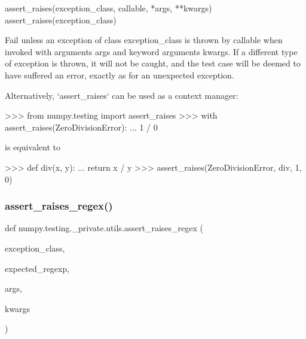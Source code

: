 \begin{DoxyVerb}assert_raises(exception_class, callable, *args, **kwargs)
assert_raises(exception_class)

Fail unless an exception of class exception_class is thrown
by callable when invoked with arguments args and keyword
arguments kwargs. If a different type of exception is
thrown, it will not be caught, and the test case will be
deemed to have suffered an error, exactly as for an
unexpected exception.

Alternatively, `assert_raises` can be used as a context manager:

>>> from numpy.testing import assert_raises
>>> with assert_raises(ZeroDivisionError):
...     1 / 0

is equivalent to

>>> def div(x, y):
...     return x / y
>>> assert_raises(ZeroDivisionError, div, 1, 0)\end{DoxyVerb}
 \mbox{\label{namespacenumpy_1_1testing_1_1__private_1_1utils_acd8515eb99f8c5de4fa3d8739189eb1e}} 
\subsubsection{\texorpdfstring{assert\+\_\+raises\+\_\+regex()}{assert\_raises\_regex()}}
{\footnotesize\ttfamily def numpy.\+testing.\+\_\+private.\+utils.\+assert\+\_\+raises\+\_\+regex (\begin{DoxyParamCaption}\item[{}]{exception\+\_\+class,  }\item[{}]{expected\+\_\+regexp,  }\item[{}]{args,  }\item[{}]{kwargs }\end{DoxyParamCaption})}


